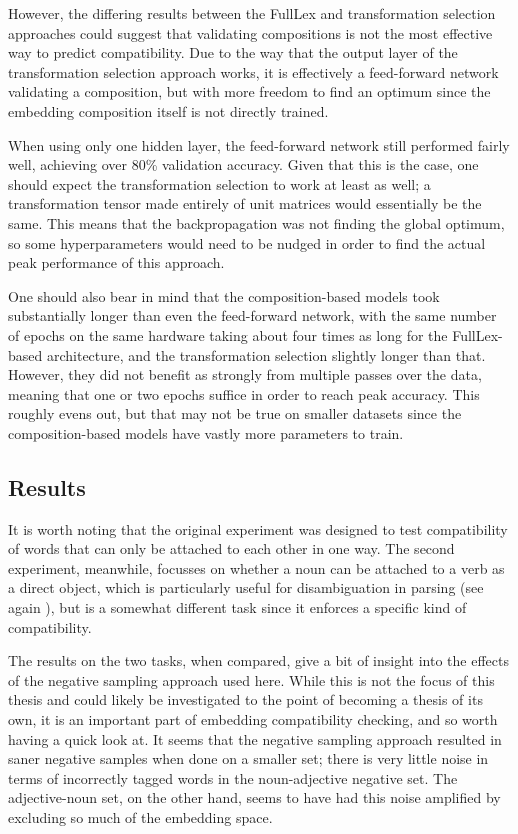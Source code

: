 \documentclass[a4paper, 12pt]{article}
\begin{document}
However, the differing results between the FullLex and transformation selection approaches could suggest that validating compositions is not the most effective way to predict compatibility. Due to the way that the output layer of the transformation selection approach works, it is effectively a feed-forward network validating a composition, but with more freedom to find an optimum since the embedding composition itself is not directly trained.

When using only one hidden layer, the feed-forward network still performed fairly well, achieving over 80\% validation accuracy. Given that this is the case, one should expect the transformation selection to work at least as well; a transformation tensor made entirely of unit matrices would essentially be the same. This means that the backpropagation was not finding the global optimum, so some hyperparameters would need to be nudged in order to find the actual peak performance of this approach.

One should also bear in mind that the composition-based models took substantially longer than even the feed-forward network, with the same number of epochs on the same hardware taking about four times as long for the FullLex-based architecture, and the transformation selection slightly longer than that. However, they did not benefit as strongly from multiple passes over the data, meaning that one or two epochs suffice in order to reach peak accuracy. This roughly evens out, but that may not be true on smaller datasets since the composition-based models have vastly more parameters to train.

\subsection{Results}

It is worth noting that the original experiment was designed to test compatibility of words that can only be attached to each other in one way. The second experiment, meanwhile, focusses on whether a noun can be attached to a verb as a direct object, which is particularly useful for disambiguation in parsing (see again \cite{vanNoord}), but is a somewhat different task since it enforces a specific kind of compatibility.

The results on the two tasks, when compared, give a bit of insight into the effects of the negative sampling approach used here. While this is not the focus of this thesis and could likely be investigated to the point of becoming a thesis of its own, it is an important part of embedding compatibility checking, and so worth having a quick look at. It seems that the negative sampling approach resulted in saner negative samples when done on a smaller set; there is very little noise in terms of incorrectly tagged words in the noun-adjective negative set. The adjective-noun set, on the other hand, seems to have had this noise amplified by excluding so much of the embedding space.
\end{document}
